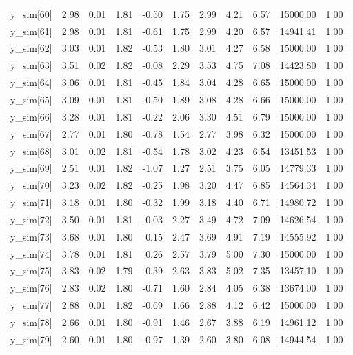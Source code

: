 \begin{table}[ht]
\begin{tabular}{rrrrrrrrrrr}
  y\_sim[60] & 2.98 & 0.01 & 1.81 & -0.50 & 1.75 & 2.99 & 4.21 & 6.57 & 15000.00 & 1.00 \\ 
  y\_sim[61] & 2.98 & 0.01 & 1.81 & -0.61 & 1.75 & 2.99 & 4.20 & 6.57 & 14941.41 & 1.00 \\ 
  y\_sim[62] & 3.03 & 0.01 & 1.82 & -0.53 & 1.80 & 3.01 & 4.27 & 6.58 & 15000.00 & 1.00 \\ 
  y\_sim[63] & 3.51 & 0.02 & 1.82 & -0.08 & 2.29 & 3.53 & 4.75 & 7.08 & 14423.80 & 1.00 \\ 
  y\_sim[64] & 3.06 & 0.01 & 1.81 & -0.45 & 1.84 & 3.04 & 4.28 & 6.65 & 15000.00 & 1.00 \\ 
  y\_sim[65] & 3.09 & 0.01 & 1.81 & -0.50 & 1.89 & 3.08 & 4.28 & 6.66 & 15000.00 & 1.00 \\ 
  y\_sim[66] & 3.28 & 0.01 & 1.81 & -0.22 & 2.06 & 3.30 & 4.51 & 6.79 & 15000.00 & 1.00 \\ 
  y\_sim[67] & 2.77 & 0.01 & 1.80 & -0.78 & 1.54 & 2.77 & 3.98 & 6.32 & 15000.00 & 1.00 \\ 
  y\_sim[68] & 3.01 & 0.02 & 1.81 & -0.54 & 1.78 & 3.02 & 4.23 & 6.54 & 13451.53 & 1.00 \\ 
  y\_sim[69] & 2.51 & 0.01 & 1.82 & -1.07 & 1.27 & 2.51 & 3.75 & 6.05 & 14779.33 & 1.00 \\ 
  y\_sim[70] & 3.23 & 0.02 & 1.82 & -0.25 & 1.98 & 3.20 & 4.47 & 6.85 & 14564.34 & 1.00 \\ 
  y\_sim[71] & 3.18 & 0.01 & 1.80 & -0.32 & 1.99 & 3.18 & 4.40 & 6.71 & 14980.72 & 1.00 \\ 
  y\_sim[72] & 3.50 & 0.01 & 1.81 & -0.03 & 2.27 & 3.49 & 4.72 & 7.09 & 14626.54 & 1.00 \\ 
  y\_sim[73] & 3.68 & 0.01 & 1.80 & 0.15 & 2.47 & 3.69 & 4.91 & 7.19 & 14555.92 & 1.00 \\ 
  y\_sim[74] & 3.78 & 0.01 & 1.81 & 0.26 & 2.57 & 3.79 & 5.00 & 7.30 & 15000.00 & 1.00 \\ 
  y\_sim[75] & 3.83 & 0.02 & 1.79 & 0.39 & 2.63 & 3.83 & 5.02 & 7.35 & 13457.10 & 1.00 \\ 
  y\_sim[76] & 2.83 & 0.02 & 1.80 & -0.71 & 1.60 & 2.84 & 4.05 & 6.38 & 13674.00 & 1.00 \\ 
  y\_sim[77] & 2.88 & 0.01 & 1.82 & -0.69 & 1.66 & 2.88 & 4.12 & 6.42 & 15000.00 & 1.00 \\ 
  y\_sim[78] & 2.66 & 0.01 & 1.80 & -0.91 & 1.46 & 2.67 & 3.88 & 6.19 & 14961.12 & 1.00 \\ 
  y\_sim[79] & 2.60 & 0.01 & 1.80 & -0.97 & 1.39 & 2.60 & 3.80 & 6.08 & 14944.54 & 1.00 \\ 

\end{tabular}
\end{table}
